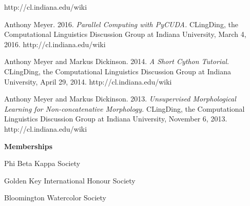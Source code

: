 \begin{singlespace}
\begin{description}
http://cl.indiana.edu/wiki
\item  Anthony Meyer. 2016. \emph{Parallel Computing with PyCUDA.} CLingDing, the
Computational Linguistics Discussion Group at Indiana University, March 4,
2016. http://cl.indiana.edu/wiki
\item Anthony Meyer and Markus Dickinson. 2014. \emph{A Short Cython Tutorial.} CLingDing,
the Computational Linguistics Discussion Group at Indiana University, April 29,
2014. http://cl.indiana.edu/wiki
\item Anthony Meyer and Markus Dickinson. 2013. \emph{Unsupervised Morphological Learning
for Non-concatenative Morphology.} CLingDing, the Computational Linguistics
Discussion Group at Indiana University, November 6, 2013.
http://cl.indiana.edu/wiki
\end{description}
\vspace{18pt}






\centerline{\textbf{\large Memberships}}
\vspace{7pt}
\centerline{Phi Beta Kappa Society}
\centerline{Golden Key International Honour Society}
\centerline{Bloomington Watercolor Society}
\end{singlespace}

